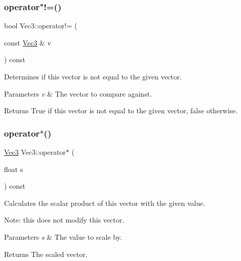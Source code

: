 \subsubsection{\texorpdfstring{operator"!=()}{operator!=()}\hspace{0.1cm}{\footnotesize\ttfamily [2/2]}}
{\footnotesize\ttfamily bool Vec3\+::operator!= (\begin{DoxyParamCaption}\item[{const \hyperlink{classVec3}{Vec3} \&}]{v }\end{DoxyParamCaption}) const\hspace{0.3cm}{\ttfamily [inline]}}

Determines if this vector is not equal to the given vector.


\begin{DoxyParams}{Parameters}
{\em v} & The vector to compare against.\\
\hline
\end{DoxyParams}
\begin{DoxyReturn}{Returns}
True if this vector is not equal to the given vector, false otherwise. 
\end{DoxyReturn}
\mbox{\label{classVec3_a81cf3600f990587096ec519b99f3b94d}} 
\subsubsection{\texorpdfstring{operator$\ast$()}{operator*()}\hspace{0.1cm}{\footnotesize\ttfamily [1/2]}}
{\footnotesize\ttfamily \hyperlink{classVec3}{Vec3} Vec3\+::operator$\ast$ (\begin{DoxyParamCaption}\item[{float}]{s }\end{DoxyParamCaption}) const\hspace{0.3cm}{\ttfamily [inline]}}

Calculates the scalar product of this vector with the given value.

Note\+: this does not modify this vector.


\begin{DoxyParams}{Parameters}
{\em s} & The value to scale by. \\
\hline
\end{DoxyParams}
\begin{DoxyReturn}{Returns}
The scaled vector. 
\end{DoxyReturn}
\mbox{\label{classVec3_a81cf3600f990587096ec519b99f3b94d}} 
